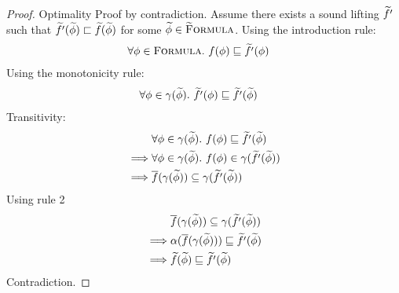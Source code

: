 \begin{proof}
    Optimality
        Proof by contradiction.
        Assume there exists a sound lifting $\widetilde{f'}$ such that $\widetilde{f'}(\widetilde{\phi}) \sqsubset \widetilde{f}(\widetilde{\phi})$ for some $\widetilde{\phi} \in \textup{\textsc{\ensuremath{\widetilde{\text{F}}}ormula}}$.
        Using the introduction rule:
        \begin{align*}
        &\forall \phi \in \textup{\textsc{Formula}}.~ f(\phi) \sqsubseteq \widetilde{f'}(\phi)
        \end{align*}
        Using the monotonicity rule:
        \begin{align*}
        &\forall \phi \in \gamma(\widetilde{\phi}).~ \widetilde{f'}(\phi) \sqsubseteq \widetilde{f'}(\widetilde{\phi})
        \end{align*}
        Transitivity:
        \begin{align*}
        &\forall \phi \in \gamma(\widetilde{\phi}).~ f(\phi) \sqsubseteq \widetilde{f'}(\widetilde{\phi})\\
        \implies
        &\forall \phi \in \gamma(\widetilde{\phi}).~ f(\phi) \in \gamma(\widetilde{f'}(\widetilde{\phi}))\\
        \implies
        &\overline{f}(\gamma(\widetilde{\phi})) \subseteq \gamma(\widetilde{f'}(\widetilde{\phi}))\\
        \end{align*}
        Using rule 2
        \begin{align*}
        &\overline{f}(\gamma(\widetilde{\phi})) \subseteq \gamma(\widetilde{f'}(\widetilde{\phi}))\\
        \implies
        &\alpha(\overline{f}(\gamma(\widetilde{\phi}))) \sqsubseteq \widetilde{f'}(\widetilde{\phi})\\
        \implies
        &\widetilde{f}(\widetilde{\phi}) \sqsubseteq \widetilde{f'}(\widetilde{\phi})\\
        \end{align*}
        Contradiction.
\end{proof}


